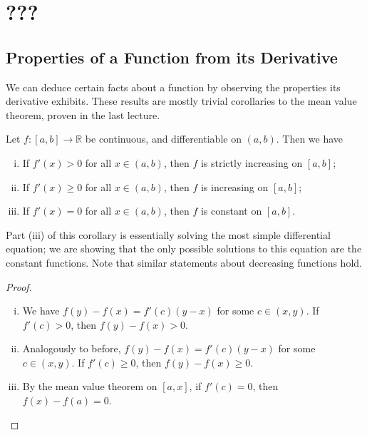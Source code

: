 \documentclass{article}
\begin{document}
\section{???}
\subsection{Properties of a Function from its Derivative}
We can deduce certain facts about a function by observing the properties its derivative exhibits. These results are mostly trivial corollaries to the mean value theorem, proven in the last lecture.
\begin{corollary}
    Let $f \colon [a,b] \to \mathbb R$ be continuous, and differentiable on $(a, b)$. Then we have
    \begin{enumerate}[(i)]
        \item If $f'(x) > 0$ for all $x \in (a, b)$, then $f$ is strictly increasing on $[a, b]$;
        \item If $f'(x) \geq 0$ for all $x \in (a, b)$, then $f$ is increasing on $[a, b]$;
        \item If $f'(x) = 0$ for all $x \in (a, b)$, then $f$ is constant on $[a, b]$.
    \end{enumerate}
\end{corollary}
\noindent Part (iii) of this corollary is essentially solving the most simple differential equation; we are showing that the only possible solutions to this equation are the constant functions. Note that similar statements about decreasing functions hold.
\begin{proof}
    \begin{enumerate}[(i)]
        \item We have $f(y) - f(x) = f'(c)(y-x)$ for some $c \in (x, y)$. If $f'(c) > 0$, then $f(y) - f(x) > 0$.
        \item Analogously to before, $f(y) - f(x) = f'(c)(y-x)$ for some $c \in (x, y)$. If $f'(c) \geq 0$, then  $f(y) - f(x) \geq 0$.
        \item By the mean value theorem on $[a, x]$, if $f'(c) = 0$, then $f(x) - f(a) = 0$.
    \end{enumerate}
\end{proof}
\end{document}
